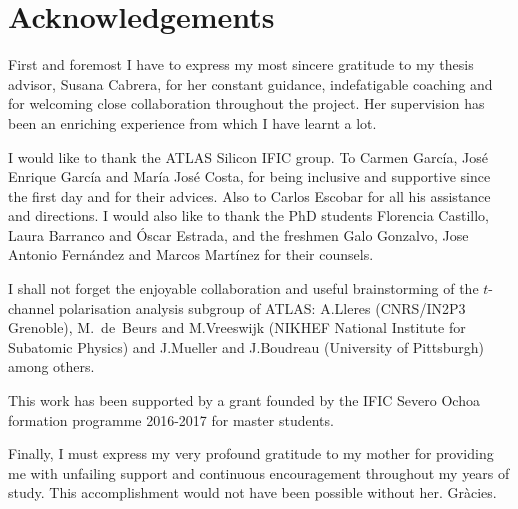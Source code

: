 

\section*{Acknowledgements}
First and foremost I have to express my most sincere gratitude to my thesis advisor, Susana Cabrera, for her constant guidance, indefatigable coaching and for welcoming close collaboration throughout the project. Her supervision has been an enriching experience from which I have learnt a lot.

I would like to thank the ATLAS Silicon IFIC group. To Carmen García, José Enrique García and María José Costa, for being inclusive and supportive since the first day and for their advices. Also to Carlos Escobar for all his assistance and directions. I would also like to thank the PhD students Florencia Castillo, Laura Barranco and Óscar Estrada, and the freshmen Galo Gonzalvo, Jose Antonio Fernández and Marcos Martínez for their counsels.

I shall not forget the enjoyable collaboration and useful brainstorming of the $t$-channel polarisation analysis subgroup of ATLAS: A.Lleres (CNRS/IN2P3 Grenoble), M.~de~Beurs and M.Vreeswijk (NIKHEF National Institute for Subatomic Physics) and J.Mueller
and J.Boudreau (University of Pittsburgh) among others.

This work has been supported by a grant founded by the IFIC Severo Ochoa formation programme 2016-2017 for master students.


%
Finally, I must express my very profound gratitude to my mother for providing me with unfailing support and continuous encouragement throughout my years of study. This accomplishment would not have been possible without her. Gràcies.

